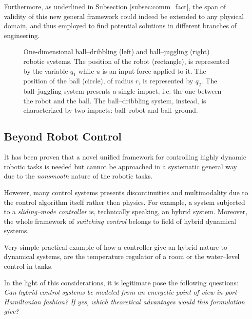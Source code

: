 Furthermore, as underlined in Subsection \ref{subsec:comm_fact}, the span of validity of this new general framework could indeed be extended to any physical domain, and thus employed to find potential solutions in different branches of engineering.
%
\begin{figure}[!t]
	\centering
	
	
	\caption{One-dimensional ball--dribbling (left) and ball--juggling (right) robotic systems. The position of the robot (rectangle), is represented by the variable $q_1$ while $u$ is an input force applied to it. The position of the ball (circle), of radius $r$, is represented by $q_2$. The ball--juggling system presents a single impact, i.e. the one between the robot and the ball. The ball--dribbling system, instead, is characterized by two impacts: ball--robot and ball--ground.}
	\label{fig:1D}
\end{figure}
%
\subsection{Beyond Robot Control}
It has been proven that a novel unified framework for controlling highly dynamic robotic tasks is needed but cannot be approached in a systematic general way due to the \textit{nonsmooth} nature of the robotic tasks.
%
\newline

%
However, many control systems presents discontinuities and multimodality due to the control algorithm itself rather then physics. 
For example, a system subjected to a \textit{sliding--mode controller} \cite{pisano2011sliding} is, technically speaking, an hybrid system. Moreover, the whole framework of \textit{switching control} belongs to field of hybrid dynamical systems.
%
\newline

%
Very simple practical example of how a controller give an hybrid nature to dynamical systems, are the temperature regulator of a room or the water--level control in tanks.
%
\newline
    
%
In the light of this considerations, it is legitimate pose the following questions: \newline
\textit{Can hybrid control systems be modeled from an energetic point of view in port--Hamiltonian fashion?}\newline
\textit{If yes, which theoretical advantages would this formulation give?}

